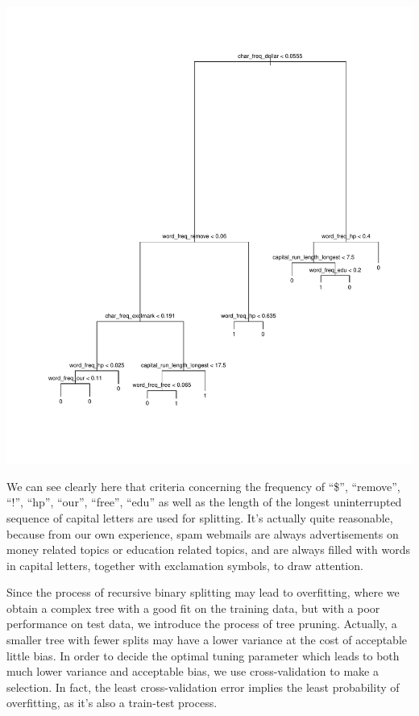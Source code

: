 \documentclass[
  11pt,
]{article}
\begin{document}
\includegraphics{report_files/figure-latex/Task_2_3-1.pdf}

We can see clearly here that criteria concerning the frequency of ``\$'', ``remove'', ``!'', ``hp'', ``our'', ``free'', ``edu'' as well as the length of the longest uninterrupted sequence of capital letters are used for splitting. It's actually quite reasonable, because from our own experience, spam webmails are always advertisements on money related topics or education related topics, and are always filled with words in capital letters, together with exclamation symbols, to draw attention.

Since the process of recursive binary splitting may lead to overfitting, where we obtain a complex tree with a good fit on the training data, but with a poor performance on test data, we introduce the process of tree pruning. Actually, a smaller tree with fewer splits may have a lower variance at the cost of acceptable little bias.
In order to decide the optimal tuning parameter which leads to both much lower variance and acceptable bias, we use cross-validation to make a selection. In fact, the least cross-validation error implies the least probability of overfitting, as it's also a train-test process.
\end{document}
